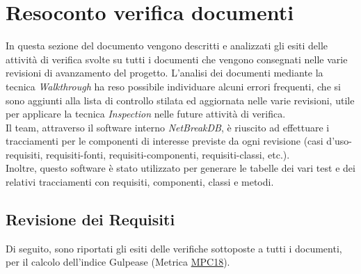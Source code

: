 \newpage
\section{Resoconto verifica documenti}

In questa sezione del documento vengono descritti e analizzati gli esiti delle attività di verifica svolte su tutti i documenti che vengono consegnati nelle varie revisioni di avanzamento del progetto.
L’analisi dei documenti mediante la tecnica \textit{Walkthrough} ha reso possibile individuare alcuni errori frequenti, che si sono aggiunti alla lista di controllo stilata ed aggiornata nelle varie revisioni, utile per applicare la tecnica \textit{Inspection} nelle future attività di verifica.\\
Il team, attraverso il software interno \textit{NetBreakDB}, è riuscito ad effettuare i tracciamenti per le componenti di interesse previste da ogni revisione (casi d’uso-requisiti, requisiti-fonti, requisiti-componenti, requisiti-classi, etc.).\\
Inoltre, questo software è stato utilizzato per generare le tabelle dei vari test e dei relativi tracciamenti con requisiti, componenti, classi e metodi.
	
	\subsection{Revisione dei Requisiti}
	Di seguito, sono riportati gli esiti delle verifiche sottoposte a tutti i documenti, per il calcolo dell’indice Gulpease (Metrica \hyperlink{MPC18}{MPC18}).
	
